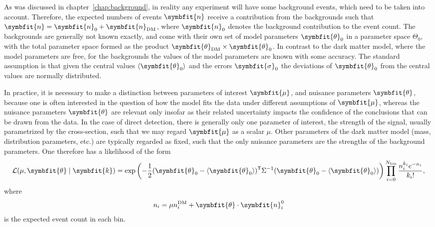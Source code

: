 \documentclass[b5paper, 10pt, twoside]{book}
\renewcommand{\vec}[1]{\symbfit{#1}}
\newcommand{\tmean}[1]{\langle#1\rangle}
\newcommand{\transp}{\mathsf{T}}
\begin{document}
As was discussed in chapter~\ref{chap:background}, in reality any experiment will have some background events, which need to be taken into account. Therefore, the expected numbers of events $\vec{n}$ receive a contribution from the backgrounds such that $\vec{n}=\vec{n}_\text{0}+\vec{n}_\text{DM}$, where $\vec{n}_\text{0}$ denotes the background contribution to the event count. The backgrounds are generally not known exactly, and come with their own set of model parameters $\vec{\theta}_0$ in a parameter space $\Theta_0$, with the total parameter space formed as the product $\vec{\theta}_\text{DM}\times\vec{\theta}_0$. In contrast to the dark matter model, where the model parameters are free, for the backgrounds the values of the model parameters are known with some accuracy. The standard assumption is that given the central values $\tmean{\vec{\theta}_0}$ and the errors $\vec{\sigma}_0$ the deviations of $\vec{\theta}_0$ from the central values are normally distributed.

In practice, it is necessary to make a distinction between parameters of interest $\vec{\mu}$, and nuisance parameters $\vec{\theta}$, because one is often interested in the question of how the model fits the data under different assumptions of $\vec{\mu}$, whereas the nuisance parameters $\vec{\theta}$ are relevant only insofar as their related uncertainty impacts the confidence of the conclusions that can be drawn from the data. In the case of direct detection, there is generally only one parameter of interest, the strength of the signal, usually parametrized by the cross-section, such that we may regard $\vec{\mu}$ as a scalar $\mu$. Other parameters of the dark matter model (mass, distribution parameters, etc.) are typically regarded as fixed, such that the only nuisance parameters are the strengths of the background parameters. One therefore has a likelihood of the form
\begin{equation}
\mathcal{L}(\mu,\vec{\theta}\mid\vec{k})=\exp\left(-\frac{1}{2}(\vec{\theta}_0-\tmean{\vec{\theta}_0})^\transp\Sigma^{-1}(\vec{\theta}_0-\tmean{\vec{\theta}_0})\right)\prod_{i=0}^{N_\text{bin}}\frac{n_i^{k_i}e^{-n_i}}{{k_i}!},
\label{eq:likelihood}
\end{equation}
where
\begin{equation}
n_i=\mu n_i^\text{DM}+\vec{\theta}\cdot\vec{n}_i^0
\end{equation}
is the expected event count in each bin.
\end{document}
